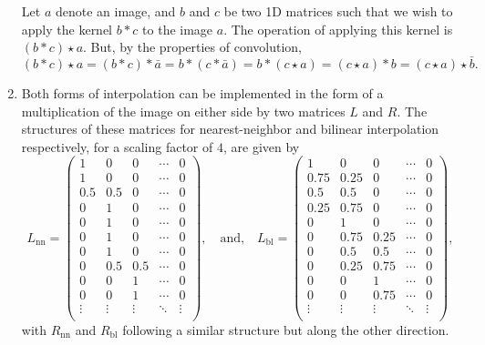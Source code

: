 \documentclass{article}[a4paper]
\begin{document}
\begin{enumerate}
	Let $a$ denote an image, and $b$ and $c$ be two 1D matrices such that we wish to apply the kernel $b \ast c$ to the image $a$. The operation
	of applying this kernel is $(b \ast c) \star a$. But, by the properties of convolution, \[
		(b \ast c) \star a = (b \ast c) \ast \bar{a} = b \ast (c \ast \bar{a}) = b \ast (c \star a) = (c \star a) \ast b = (c \star a) \star \bar{b}.
	\] 
	
	\item Both forms of interpolation can be implemented in the form of a multiplication of the image on either side by two matrices $L$ and $R$.
	The structures of these matrices for nearest-neighbor and bilinear interpolation respectively, for a scaling factor of $4$, are given by \[
		L_\text{nn} = \begin{pmatrix}
			1	& 0 	& 0 & \cdots & 0 \\
			1	& 0 	& 0 & \cdots & 0 \\
			0.5	& 0.5 	& 0 & \cdots & 0 \\
			0	& 1		& 0 & \cdots & 0 \\
			0	& 1		& 0 & \cdots & 0 \\
			0	& 1		& 0 & \cdots & 0 \\
			0	& 1		& 0 & \cdots & 0 \\
			0	& 0.5	& 0.5 & \cdots & 0 \\
			0	& 0		& 1 & \cdots & 0 \\
			0	& 0		& 1 & \cdots & 0 \\
			\vdots & \vdots & \vdots & \ddots & \vdots \\
		\end{pmatrix},
		\quad\text{and,}\quad
		L_\text{bl} = \begin{pmatrix}
			1	& 0 	& 0 & \cdots & 0 \\
			0.75& 0.25 	& 0 & \cdots & 0 \\
			0.5	& 0.5 	& 0 & \cdots & 0 \\
			0.25& 0.75	& 0 & \cdots & 0 \\
			0	& 1		& 0 & \cdots & 0 \\
			0	& 0.75	& 0.25 & \cdots & 0 \\
			0	& 0.5	& 0.5 & \cdots & 0 \\
			0	& 0.25	& 0.75 & \cdots & 0 \\
			0	& 0		& 1 & \cdots & 0 \\
			0	& 0		& 0.75 & \cdots & 0 \\
			\vdots & \vdots & \vdots & \ddots & \vdots \\
		\end{pmatrix},
	\] with $R_\text{nn}$ and $R_\text{bl}$ following a similar structure but along the other direction.
	

\end{enumerate}
\end{document}
